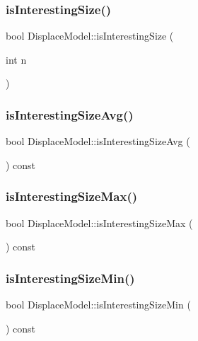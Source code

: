 \subsubsection{\texorpdfstring{isInterestingSize()}{isInterestingSize()}}
{\footnotesize\ttfamily bool Displace\+Model\+::is\+Interesting\+Size (\begin{DoxyParamCaption}\item[{int}]{n }\end{DoxyParamCaption})}

\mbox{\label{class_displace_model_ae1be69ab922ef18f9da9b59d28540bfe}} 
\subsubsection{\texorpdfstring{isInterestingSizeAvg()}{isInterestingSizeAvg()}}
{\footnotesize\ttfamily bool Displace\+Model\+::is\+Interesting\+Size\+Avg (\begin{DoxyParamCaption}{ }\end{DoxyParamCaption}) const\hspace{0.3cm}{\ttfamily [inline]}}

\mbox{\label{class_displace_model_ab80f0e704341132ab80f47770d9c2b66}} 
\subsubsection{\texorpdfstring{isInterestingSizeMax()}{isInterestingSizeMax()}}
{\footnotesize\ttfamily bool Displace\+Model\+::is\+Interesting\+Size\+Max (\begin{DoxyParamCaption}{ }\end{DoxyParamCaption}) const\hspace{0.3cm}{\ttfamily [inline]}}

\mbox{\label{class_displace_model_a9493dcb21eab814aa456331d90d4ee4e}} 
\subsubsection{\texorpdfstring{isInterestingSizeMin()}{isInterestingSizeMin()}}
{\footnotesize\ttfamily bool Displace\+Model\+::is\+Interesting\+Size\+Min (\begin{DoxyParamCaption}{ }\end{DoxyParamCaption}) const\hspace{0.3cm}{\ttfamily [inline]}}

